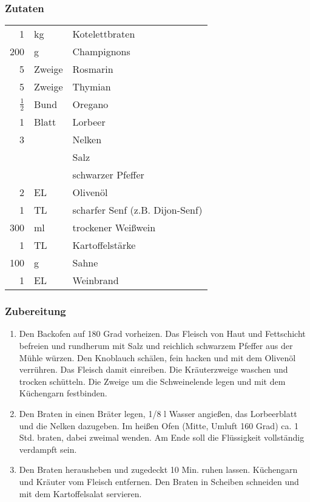 \subsubsection*{Zutaten}
\begin{tabular}{rll}
	          1 & kg       & Kotelettbraten                   \\
	          200 & g       & Champignons                     \\
	            5 & Zweige  & Rosmarin                        \\
	            5 & Zweige  & Thymian                         \\
	$ \frac{1}{2}$ & Bund    & Oregano                        \\
	          1 & Blatt & Lorbeer               \\
	            3 &       & Nelken\\
	              &         & Salz                            \\
	              &         & schwarzer Pfeffer               \\
	            2 & EL      & Olivenöl                          \\
	            1 & TL      & scharfer Senf (z.B. Dijon-Senf) \\
	          300 & ml      & trockener Weißwein              \\
	            1 & TL      & Kartoffelstärke                 \\
	          100 & g       & Sahne                           \\
	            1 & EL      & Weinbrand
\end{tabular} 
\subsubsection*{Zubereitung}
\begin{enumerate}
	\item Den Backofen auf 180 Grad vorheizen. Das Fleisch von Haut und Fettschicht befreien und rundherum mit Salz und reichlich schwarzem Pfeffer aus der Mühle würzen. Den Knoblauch schälen, fein hacken und mit dem Olivenöl verrühren. Das Fleisch damit einreiben. Die Kräuterzweige waschen und trocken schütteln. Die Zweige um die Schweinelende legen und mit dem Küchengarn festbinden. 
	\item Den Braten in einen Bräter legen, 1/8 l Wasser angießen, das Lorbeerblatt und die Nelken dazugeben. Im heißen Ofen (Mitte, Umluft 160 Grad) ca. 1 Std. braten, dabei zweimal wenden. Am Ende soll die Flüssigkeit vollständig verdampft sein. 
	\item Den Braten herausheben und zugedeckt 10 Min. ruhen lassen. Küchengarn und Kräuter vom Fleisch entfernen. Den Braten in Scheiben schneiden und mit dem Kartoffelsalat servieren. 
\end{enumerate}

